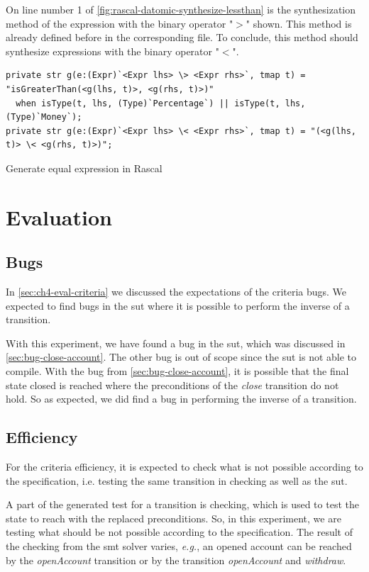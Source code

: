 On line number 1 of \autoref{fig:rascal-datomic-synthesize-lessthan} is the
synthesization method of the expression with the binary operator "$>$" shown.
This method is already defined before in the corresponding file. To conclude,
this method should synthesize expressions with the binary operator "$<$".

\begin{sourcecode}[h!]
\begin{lstlisting}[]
private str g(e:(Expr)`<Expr lhs> \> <Expr rhs>`, tmap t) = "isGreaterThan(<g(lhs, t)>, <g(rhs, t)>)"
  when isType(t, lhs, (Type)`Percentage`) || isType(t, lhs, (Type)`Money`);
private str g(e:(Expr)`<Expr lhs> \< <Expr rhs>`, tmap t) = "(<g(lhs, t)> \< <g(rhs, t)>)";
\end{lstlisting}
\caption{Generate equal expression in Rascal}\label{fig:rascal-datomic-synthesize-lessthan}
\end{sourcecode}
\FloatBarrier

\section{Evaluation}\label{sec:ch4-evaluation}

\subsection{Bugs}
In \autoref{sec:ch4-eval-criteria} we discussed the expectations of the criteria
bugs. We expected to find bugs in the \gls{sut} where it is possible to perform the
inverse of a transition.

With this experiment, we have found a bug in the \gls{sut}, which was
discussed in \autoref{sec:bug-close-account}. The other bug is out of scope
since the \gls{sut} is not able to compile. With the bug from
\autoref{sec:bug-close-account}, it is possible that the final state closed is
reached where the preconditions of the \textit{close} transition do not hold.
So as expected, we did find a bug in performing the inverse of a transition.

\subsection{Efficiency}
For the criteria efficiency, it is expected to check what is not possible
according to the specification, i.e. testing the same transition in checking as
well as the \gls{sut}.

A part of the generated test for a transition is checking, which is used to test
the state to reach with the replaced preconditions. So, in this experiment, we
are testing what should be not possible according to the
specification. The result of the checking from the \gls{smt} solver varies,
\textit{e.g.}, an opened account can be reached by the \textit{openAccount}
transition or by the transition \textit{openAccount} and \textit{withdraw}.

